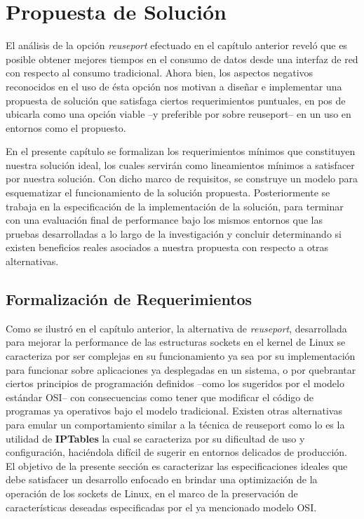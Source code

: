 \chapter{Propuesta de Solución}
El análisis de la opción \emph{reuseport} efectuado en el capítulo anterior reveló que es posible obtener mejores tiempos en el consumo de datos desde una interfaz de red con respecto al consumo tradicional. Ahora bien, los aspectos negativos reconocidos en el uso de ésta opción nos motivan a diseñar e implementar una propuesta de solución que satisfaga ciertos requerimientos puntuales, en pos de ubicarla como una opción viable --y preferible por sobre reuseport-- en un uso en entornos como el propuesto.

En el presente capítulo se formalizan los requerimientos mínimos que constituyen nuestra solución ideal, los cuales servirán como lineamientos mínimos a satisfacer por nuestra solución. Con dicho marco de requisitos, se construye un modelo para esquematizar el funcionamiento de la solución propuesta. Posteriormente se trabaja en la especificación de la implementación de la solución, para terminar con una evaluación final de performance bajo los mismos entornos que las pruebas desarrolladas a lo largo de la investigación y concluir determinando si existen beneficios reales asociados a nuestra propuesta con respecto a otras alternativas.

\section{Formalización de Requerimientos}
Como se ilustró en el capítulo anterior, la alternativa de \emph{reuseport}, desarrollada para mejorar la performance de las estructuras sockets en el kernel de Linux se caracteriza por ser complejas en su funcionamiento ya sea por su implementación para funcionar sobre aplicaciones ya desplegadas en un sistema, o por quebrantar ciertos principios de programación definidos --como los sugeridos por el modelo estándar OSI-- con consecuencias como tener que modificar el código de programas ya operativos bajo el modelo tradicional. Existen otras alternativas para emular un comportamiento similar a la técnica de reuseport como lo es la utilidad de \textbf{IPTables} \cite{book:iptables} la cual se caracteriza por su dificultad de uso y configuración, haciéndola difícil de sugerir en entornos delicados de producción. El objetivo de la presente sección es caracterizar las especificaciones ideales que debe satisfacer un desarrollo enfocado en brindar una optimización de la operación de los sockets de Linux, en el marco de la preservación de características deseadas especificadas por el ya mencionado modelo OSI.

